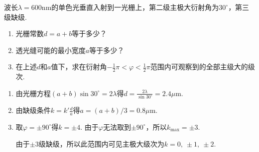 \begin{problem}[光栅][10]
    波长$\lambda=600\mathrm{nm}$的单色光垂直入射到一光栅上，第二级主极大衍射角为$30^{\circ}$，第三级缺级.
    \begin{enumerate}
        \item 光栅常数$d=a+b$等于多少？
        \item 透光缝可能的最小宽度$a$等于多少？
        \item 在上述$d$和$a$值下，求在衍射角$-\frac{1}{2}\pi<\varphi<\frac{1}{2}\pi$范围内可观察到的全部主级大的级次.
    \end{enumerate}
\end{problem}
\begin{solution}
    \begin{enumerate}
        \item 由光栅方程$(a+b)\sin30^\circ=2\lambda$得$d=\frac{2\lambda}{\sin{30^{\circ}}}=2.4\mu\mathrm{m}$.
        \item 由缺级条件$k=k'\frac{d}{a}$得$a=(a+b)/3=0.8\mu\mathrm{m}$.
        \item 取$\varphi=\pm 90^\circ$得$k=\pm4$. 由于$\varphi$无法取到$\pm 90^\circ$，所以$k_{\max}=\pm 3$.
        
        由于$\pm 3$级缺级，所以此范围内可见主极大级次为$k=0,\ \pm 1,\ \pm2$.
    \end{enumerate}
\end{solution}